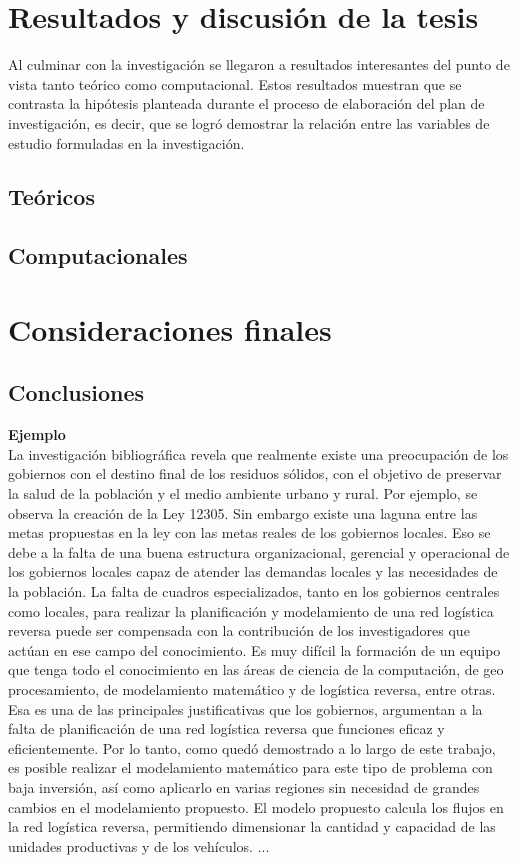 \chapter{Resultados y discusión de la tesis}


Al culminar con la investigación se llegaron a resultados interesantes del punto de vista tanto teórico como computacional. Estos resultados muestran que se contrasta la hipótesis planteada durante el proceso de elaboración del plan de investigación, es decir, que se logró demostrar la relación entre las variables de estudio formuladas en la investigación.

\section{Teóricos}

\section{Computacionales}




\chapter{Consideraciones finales}


\section{Conclusiones}

{\bf Ejemplo}\\
La investigación bibliográfica revela que realmente existe una preocupación de los gobiernos con el destino final de los residuos sólidos, con el objetivo de preservar la salud de la población y el medio ambiente urbano y rural. Por ejemplo, se observa la creación de la Ley 12305. Sin embargo existe una laguna entre las metas propuestas en la ley con las metas reales de los gobiernos locales. Eso se debe a la falta de una buena estructura organizacional, gerencial y operacional de los gobiernos locales capaz de atender las demandas locales y las necesidades de la población.
\vskip 0.3cm
La falta de cuadros especializados, tanto en los gobiernos centrales como locales, para realizar la planificación y modelamiento de una red logística reversa puede ser compensada con la contribución de los investigadores que actúan en ese campo del conocimiento. Es muy difícil la formación de un equipo que tenga todo el conocimiento en las áreas de ciencia de la computación, de geo procesamiento, de modelamiento matemático y de logística reversa, entre otras. Esa es una de las principales justificativas que los gobiernos, argumentan a la falta de planificación de una red logística reversa que funciones eficaz y eficientemente. 
\vskip 0.3cm
Por lo tanto, como quedó demostrado a lo largo de este trabajo, es posible realizar el modelamiento matemático para este tipo de problema con baja inversión, así como aplicarlo en varias regiones sin necesidad de grandes cambios en el modelamiento propuesto. El modelo propuesto calcula los flujos en la red logística reversa, permitiendo dimensionar la cantidad y capacidad de las unidades productivas y de los vehículos. 
\vskip 0.3cm
...


